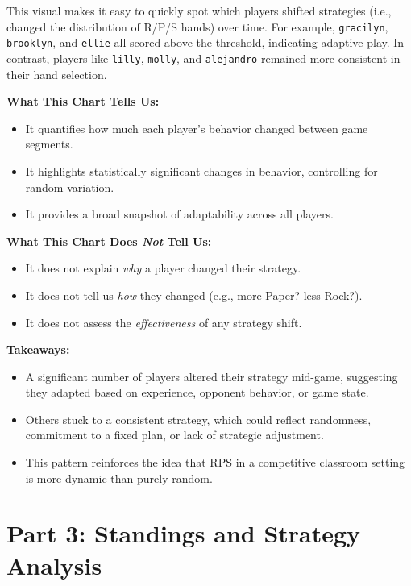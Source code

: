 \documentclass[12pt]{article}
\begin{document}
This visual makes it easy to quickly spot which players shifted strategies (i.e., changed the distribution of R/P/S hands) over time. For example, \texttt{gracilyn}, \texttt{brooklyn}, and \texttt{ellie} all scored above the threshold, indicating adaptive play. In contrast, players like \texttt{lilly}, \texttt{molly}, and \texttt{alejandro} remained more consistent in their hand selection.

\vspace{1.5cm}

\noindent\textbf{What This Chart Tells Us:}
\begin{itemize}
    \item It quantifies how much each player’s behavior changed between game segments.
    \item It highlights statistically significant changes in behavior, controlling for random variation.
    \item It provides a broad snapshot of adaptability across all players.
\end{itemize}

\noindent\textbf{What This Chart Does \emph{Not} Tell Us:}
\begin{itemize}
    \item It does not explain \textit{why} a player changed their strategy.
    \item It does not tell us \textit{how} they changed (e.g., more Paper? less Rock?).
    \item It does not assess the \textit{effectiveness} of any strategy shift.
\end{itemize}

\noindent\textbf{Takeaways:}
\begin{itemize}
    \item A significant number of players altered their strategy mid-game, suggesting they adapted based on experience, opponent behavior, or game state.
    \item Others stuck to a consistent strategy, which could reflect randomness, commitment to a fixed plan, or lack of strategic adjustment.
    \item This pattern reinforces the idea that RPS in a competitive classroom setting is more dynamic than purely random.
\end{itemize}

\newpage

\section*{Part 3: Standings and Strategy Analysis}
\end{document}
